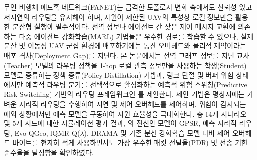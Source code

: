 무인 비행체 애드혹 네트워크(FANET)는 급격한 토폴로지 변화 속에서도 신뢰성 있고 저지연의 라우팅을 유지해야 하며, 자원이 제한된 UAV의 특성상 로컬 정보만을 활용한 분산형 실행이 필수적이다. 전역 정보나 에이전트 간 잦은 제어 메시지 교환에 의존하는 다중 에이전트 강화학습(MARL) 기법들은 우수한 경로를 학습할 수 있으나, 실제 분산 및 이동성 UAV 군집 환경에 배포하기에는 통신 오버헤드와 물리적 제약이라는 배포 격차(Deployment Gap)를 지닌다. 본 논문에서는 전역 그래프 정보를 지닌 교사(Teacher) 모델의 라우팅 정책을 1-hop 로컬 관측 정보만을 사용하는 학생(Student) 모델로 증류하는 정책 증류(Policy Distillation) 기법과, 링크 단절 및 버퍼 위험 상태에서만 예측적 라우팅 분기를 선택적으로 활성화하는 예측적 위험 스위칭(Predictive Risk Switching) 기반의 라우팅 프레임워크인 \method{}를 제안한다. 제안 기법은 평상시에는 가벼운 지리적 라우팅을 수행하여 지연 및 제어 오버헤드를 제어하며, 위험이 감지되는 예외 상황에서만 예측 모델을 구동하여 자원 효율성을 극대화한다. 총 14개 시나리오 및 5개 시드에 대한 시뮬레이션 평가 결과, \method{}의 전신인 \phaseTwelve{} 모델이 GPSR, 예측 지리적 라우팅, Evo-QGeo, IQMR Q($\lambda$), DRAMA 및 기존 분산 강화학습 모델 대비 제어 오버헤드 바이트를 현저히 적게 사용하면서도 가장 우수한 패킷 전달율(PDR) 및 전송 기한 준수율을 달성함을 확인하였다.
